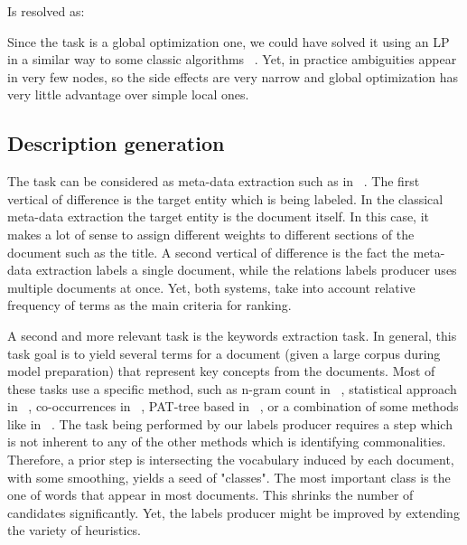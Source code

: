 \documentclass[11pt,a4paper]{article}
\begin{document}
Is resolved as:


Since the task is a global optimization one, we could have solved it using an LP in a similar way to some classic algorithms ~\cite{aumann1998log}. Yet, in practice ambiguities appear in very few nodes, so the side effects are very narrow and global optimization has very little advantage over simple local ones.

\subsection{Description generation}

The task can be considered as meta-data extraction such as in ~\cite{yilmazel2004metaextract}. The first vertical of difference is the target entity which is being labeled. In the classical meta-data extraction the target entity is the document itself. In this case, it makes a lot of sense to assign different weights to different sections of the document such as the title. A second vertical of difference is the fact the meta-data extraction labels a single document, while the relations labels producer uses multiple documents at once. Yet, both systems, take into account relative frequency of terms as the main criteria for ranking.

A second and more relevant task is the keywords extraction task. In general, this task goal is to yield several terms for a document (given a large corpus during model preparation) that represent key concepts from the documents. Most of these tasks use a specific method, such as n-gram count in ~\cite{cohen1995highlights}, statistical approach in ~\cite{luhn1957statistical}, co-occurrences in ~\cite{matsuo2004keyword}, PAT-tree based in ~\cite{chien1997pat}, or a combination of some methods like in ~\cite{zhang2008automatic}. The task being performed by our labels producer requires a step which is not inherent to any of the other methods which is identifying commonalities. Therefore, a prior step is intersecting the vocabulary induced by each document, with some smoothing, yields a seed of "classes". The most important class is the one of words that appear in most documents. This shrinks the number of candidates significantly. Yet, the labels producer might be improved by extending the variety of heuristics.
\end{document}
